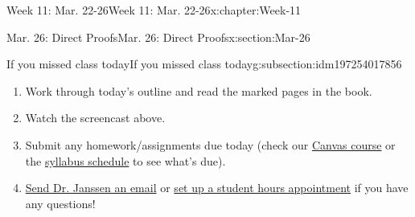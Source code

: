 \documentclass[oneside,10pt,]{book}
\numberwithin{equation}{section}
\begin{document}
\begin{chapterptx}{Week 11: Mar. 22-26}{}{Week 11: Mar. 22-26}{}{}{x:chapter:Week-11}
\begin{sectionptx}{Mar. 26: Direct Proofs}{}{Mar. 26: Direct Proofs}{}{}{x:section:Mar-26}
%
%
\typeout{************************************************}
\typeout{************************************************}
%
\begin{subsectionptx}{If you missed class today}{}{If you missed class today}{}{}{g:subsection:idm197254017856}
%
\begin{enumerate}
\item{}Work through today's outline and read the marked pages in the book.%
\item{}Watch the screencast above.%
\item{}Submit any homework\slash{}assignments due today (check our \href{https://dordt.instructure.com/courses/3110050}{Canvas course} or the \href{https://prof.mkjanssen.org/ds/index.html\#schedule}{syllabus schedule} to see what's due).%
\item{}\href{mailto:mike.janssen@dordt.edu}{Send Dr. Janssen an email} or \href{https://calendly.com/mkjanssen/student-hours}{set up a student hours appointment} if you have any questions!%
\end{enumerate}
\end{subsectionptx}
\end{sectionptx}
\end{chapterptx}
%
%
\typeout{************************************************}
\typeout{************************************************}
%
\end{document}
